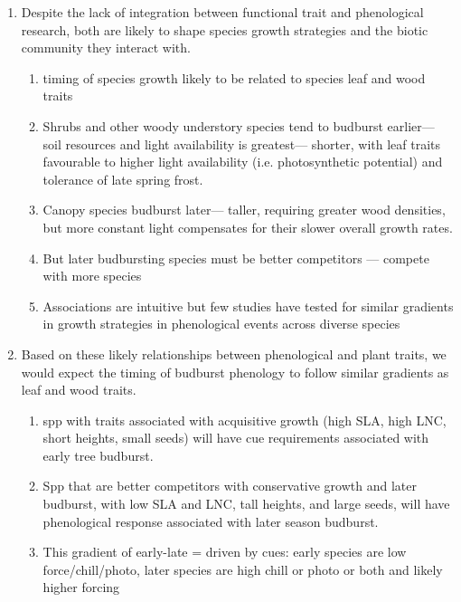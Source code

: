 \documentclass{article}
\begin{document}
\begin{enumerate}
\item Despite the lack of integration between functional trait and phenological research, both are likely to shape species growth strategies and the biotic community they interact with.
\begin{enumerate}
\item timing of species growth likely to be related to species leaf and wood traits 
\item Shrubs and other woody understory species tend to budburst earlier--- soil resources and light availability is greatest--- shorter, with leaf traits favourable to higher light availability (i.e. photosynthetic potential) and tolerance of late spring frost.
\item Canopy species budburst later--- taller, requiring greater wood densities, but more constant light compensates for their slower overall growth rates.
\item But later budbursting species must be better competitors --- compete with more species
\item Associations are intuitive but few studies have tested for similar gradients in growth strategies in phenological events across diverse species
\end{enumerate}

\item Based on these likely relationships between phenological and plant traits, we would expect the timing of budburst phenology to follow similar gradients as leaf and wood traits.
\begin{enumerate}
\item spp with traits associated with acquisitive growth (high SLA, high LNC, short heights, small seeds) will have cue requirements associated with early tree budburst. %
\item Spp that are better competitors with conservative growth and later budburst, with low SLA and LNC, tall heights, and large seeds, will have phenological response associated with later season budburst. %
\item This gradient of early-late = driven by cues: early species are low force/chill/photo, later species are high chill or photo or both and likely higher forcing %
\end{enumerate}


\end{enumerate}
\end{document}
